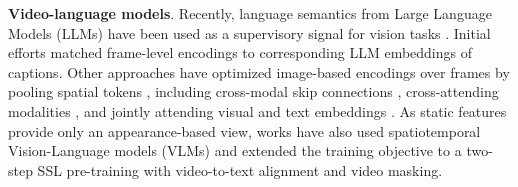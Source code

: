 \noindent
\textbf{Video-language models}. Recently, language semantics from Large Language Models (LLMs)  have been used as a supervisory signal for vision tasks . Initial efforts  matched frame-level encodings to corresponding LLM embeddings of captions. Other approaches have optimized image-based encodings over frames by pooling spatial tokens , including cross-modal skip connections , cross-attending modalities , and jointly attending visual and text embeddings . As static features provide only an appearance-based view, works have also used spatiotemporal Vision-Language models (VLMs)  and extended the training objective  to a two-step SSL pre-training with video-to-text alignment and video masking.
